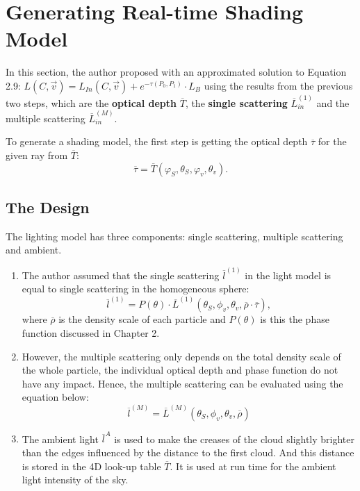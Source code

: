 \section{Generating Real-time Shading Model}
In this section, the author proposed with an approximated solution to Equation 2.9: $L(C, \vec{v}) = L_{In}(C, \vec{v}) + e^{-\tau(P_0, P_1)} \cdot L_B$ using the results from the previous two steps, which are the \textbf{optical depth} $\overline{T}$, the \textbf{single scattering} $\overline{L}_{in}^{(1)}$ and the multiple scattering $\overline{L}_{in}^{(M)}$.

To generate a shading model, the first step is getting the optical depth $\overline{\tau}$ for the given ray from $\overline{T}$:
\begin{equation}
\overline{\tau} = \overline{T}(\varphi_S, \theta_S, \varphi_v, \theta_v).
\end{equation}

\subsection{The Design}
The lighting model has three components: single scattering, multiple scattering and ambient. 

\begin{enumerate}
\item The author assumed that the single scattering $\overline{l}^{(1)}$ in the light model is equal to single scattering in the homogeneous sphere:
\begin{equation}
\overline{l}^{(1)} = P(\theta) \cdot \overline{L}^{(1)}(\theta_S, \phi_v, \theta_v, \overline{\rho} \cdot \overline{\tau}),
\end{equation}
where $\overline{\rho}$ is the density scale of each particle and $P(\theta)$ is this the phase function discussed in Chapter 2.

\item However, the multiple scattering only depends on the total density scale of the whole particle, the individual optical depth and phase function do not have any impact. Hence, the multiple scattering can be evaluated using the equation below:
\begin{equation}
\overline{l}^{(M)} = \overline{L}^{(M)}(\theta_S, \phi_v, \theta_v, \overline{\rho})
\end{equation}

\item The ambient light $\overline{l}^{A}$ is used to make the creases of the cloud slightly brighter than the edges influenced by the distance to the first cloud. And this distance is stored in the 4D look-up table $\overline{T}$. It is used at run time for the ambient light intensity of the sky.
\end{enumerate}
 
